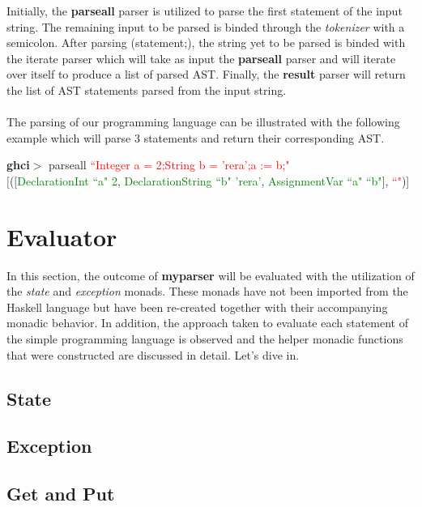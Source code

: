 \documentclass[a4paper, onecolumn]{article}
\begin{document}
    \noindent Initially, the \textbf{parse\textunderscore all} parser is utilized to parse the first statement of the input string. The remaining input to be parsed is binded through the \textit{tokenizer} with a semicolon. After parsing (statement;), the string yet to be parsed is binded with the iterate parser which will take as input the \textbf{parse\textunderscore all} parser and will iterate over itself to produce a list of parsed AST. Finally, the \textbf{result} parser will return the list of AST statements parsed from the input string. \\ \\
    The parsing of our programming language can be illustrated with the following example which will parse 3 statements and return their corresponding AST.
    
    \begin{center}
            \textbf{ghci$>$} parse\textunderscore all \textcolor{red}{``Integer a = 2;String b = 'rera';a := b;"} \\
             $\big[$($\big[$\textcolor{green}{DeclarationInt ``a" 2}, \textcolor{green}{DeclarationString ``b" 'rera'}, \textcolor{green}{AssignmentVar ``a" ``b"}$\big]$, \textcolor{red}{``"})]
        \end{center}
        
    \section{Evaluator}
    
    In this section, the outcome of \textbf{my\textunderscore parser} will be evaluated with the utilization of the \textit{state} and \textit{exception} monads. These monads have not been imported from the Haskell language but have been re-created together with their accompanying monadic behavior. In addition, the approach taken to evaluate each statement of the simple programming language is observed and the helper monadic functions that were constructed are discussed in detail. Let's dive in. 
    
    \subsection{State}
    
    \subsection{Exception}
    
    \subsection{Get and Put}
        
\end{document}
